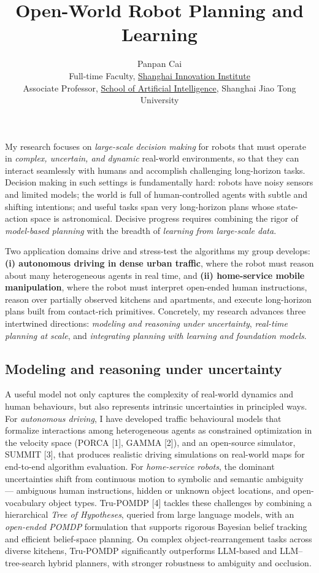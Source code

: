 \documentclass{article}
\title{Open-World Robot Planning and Learning}
\author{%
  Panpan Cai \\
  Full-time Faculty, \href{https://www.sii.edu.cn/2025/1001/c82a512/page.htm}{Shanghai Innovation Institute} \\
  Associate Professor, \href{https://soai.sjtu.edu.cn/cn/facultydetails/zzjs/caipanpan}{School of Artificial Intelligence}, Shanghai Jiao Tong University \\
}
\begin{document}
\maketitle

My research focuses on \emph{large-scale decision making} for robots that must operate in \emph{complex, uncertain, and dynamic} real-world environments, so that they can interact seamlessly with humans and accomplish challenging long-horizon tasks. Decision making in such settings is fundamentally hard: robots have noisy sensors and limited models; the world is full of human-controlled agents with subtle and shifting intentions; and useful tasks span very long-horizon plans whose state-action space is astronomical. Decisive progress requires combining the rigor of \emph{model-based planning} with the breadth of \emph{learning from large-scale data}.

Two application domains drive and stress-test the algorithms my group develops: \textbf{(i) autonomous driving in dense urban traffic}, where the robot must reason about many heterogeneous agents in real time, and \textbf{(ii) home-service mobile manipulation}, where the robot must interpret open-ended human instructions, reason over partially observed kitchens and apartments, and execute long-horizon plans built from contact-rich primitives. Concretely, my research advances three intertwined directions: \emph{modeling and reasoning under uncertainty}, \emph{real-time planning at scale}, and \emph{integrating planning with learning and foundation models}.

\subsection*{Modeling and reasoning under uncertainty}
A useful model not only captures the complexity of real-world dynamics and human behaviours, but also represents intrinsic uncertainties in principled ways. For \textit{autonomous driving}, I have developed traffic behavioural models that formalize interactions among heterogeneous agents as constrained optimization in the velocity space (PORCA [1], GAMMA [2]), and an open-source simulator, SUMMIT [3], that produces realistic driving simulations on real-world maps for end-to-end algorithm evaluation. For \textit{home-service robots}, the dominant uncertainties shift from continuous motion to symbolic and semantic ambiguity --- ambiguous human instructions, hidden or unknown object locations, and open-vocabulary object types. Tru-POMDP [4] tackles these challenges by combining a hierarchical \emph{Tree of Hypotheses}, queried from large language models, with an \emph{open-ended POMDP} formulation that supports rigorous Bayesian belief tracking and efficient belief-space planning. On complex object-rearrangement tasks across diverse kitchens, Tru-POMDP significantly outperforms LLM-based and LLM--tree-search hybrid planners, with stronger robustness to ambiguity and occlusion.
\end{document}
